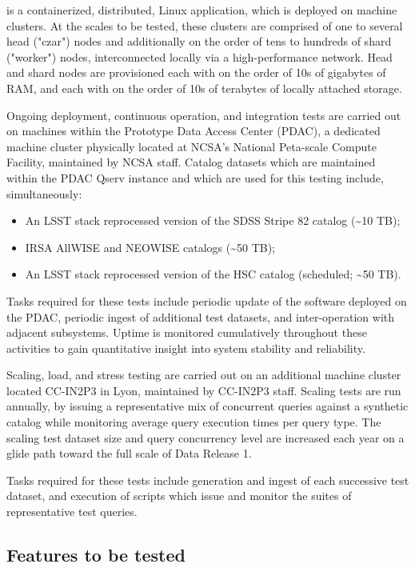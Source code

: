 \documentclass[DM,lsstdraft,STS,toc]{lsstdoc}
\begin{document}
\product{} is a containerized, distributed, Linux application, which is deployed on machine clusters.
At the scales to be tested, these clusters are comprised of one to several head ("czar") nodes and
additionally on the order of tens to hundreds of shard ("worker") nodes, interconnected locally via a
high-performance network. Head and shard nodes are provisioned each with on the order of 10s of gigabytes of
RAM, and each with on the order of 10s of terabytes of locally attached storage.

Ongoing deployment, continuous operation, and integration tests are carried out on machines within the
Prototype Data Access Center (PDAC), a dedicated machine cluster physically located at NCSA's National 
Peta-scale Compute Facility, maintained by NCSA staff. Catalog datasets which are maintained within
the PDAC Qserv instance and which are used for this testing include, simultaneously:

\begin{itemize}
  \item{An LSST stack reprocessed version of the SDSS Stripe 82 catalog ({\textasciitilde{}}10 TB);}
  \item{IRSA AllWISE and NEOWISE catalogs ({\textasciitilde{}}50 TB);}
  \item{An LSST stack reprocessed version of the HSC catalog (scheduled; {\textasciitilde{}}50 TB).}
\end{itemize}

Tasks required for these tests include periodic update of the software deployed on the PDAC,
periodic ingest of additional test datasets, and inter-operation with adjacent subsystems.  Uptime
is monitored cumulatively throughout these activities to gain quantitative insight into system
stability and reliability.

Scaling, load, and stress testing are carried out on an additional machine cluster located
CC-IN2P3 in Lyon, maintained by CC-IN2P3 staff. Scaling tests are run annually, by issuing
a representative mix of concurrent queries against a synthetic catalog while monitoring
average query execution times per query type.  The scaling test dataset size and query 
concurrency level are increased each year on a glide path toward the full scale of Data Release 1.

Tasks required for these tests include generation and ingest of each successive test dataset, and
execution of scripts which issue and monitor the suites of representative test queries.

\subsection{Features to be tested}
\label{sec:feat2test}
\end{document}
